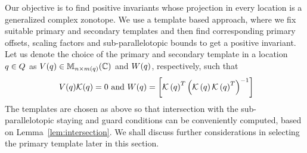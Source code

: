 
Our objective is to find positive invariants whose projection in every
location is a generalized complex zonotope.  We use a template based
approach, where we fix suitable primary and secondary templates and
then find corresponding primary offsets, scaling factors and
sub-parallelotopic bounds to get a positive invariant.  Let us denote
the choice of the primary and secondary template in a location
$q\in Q$ as $V(q)\in\mathbb{M}_{n\times m(q)}(\mathbb{\mathbb{C}})$ and
$W(q)$, respectively, such that
\begin{equation}~\label{eqn:tempselect}
V(q)\mathcal{K}(q)=0~\text{and}~
W(q)=\left[\mathcal{K}\left(q\right)^T\left(\mathcal{K}\left(q\right)\mathcal{K}\left(q\right)^T\right)^{-1}\right]
\end{equation}  
The templates are chosen as above so that intersection with the
sub-parallelotopic staying and guard conditions can be conveniently
computed, based on Lemma~\ref{lem:intersection}.  We shall discuss
further considerations in selecting the primary template later in this
section.


